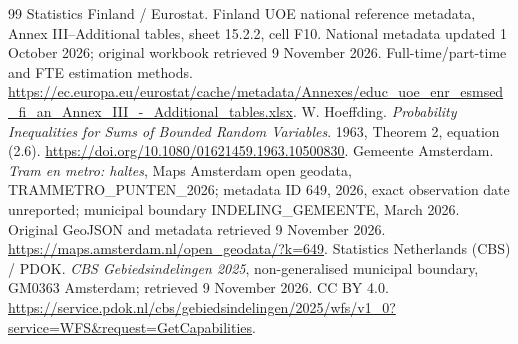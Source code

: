 \begin{thebibliography}{99}
 Statistics Finland / Eurostat. Finland UOE national
reference metadata, Annex III--Additional tables, sheet 15.2.2, cell F10.
National metadata updated 1 October 2026; original workbook retrieved
9 November 2026. Full-time/part-time and FTE estimation methods.
\url{https://ec.europa.eu/eurostat/cache/metadata/Annexes/educ_uoe_enr_esmsed_fi_an_Annex_III_-_Additional_tables.xlsx}.
 W. Hoeffding.
\textit{Probability Inequalities for Sums of Bounded Random Variables}.
1963, Theorem 2, equation (2.6).
\url{https://doi.org/10.1080/01621459.1963.10500830}.
 Gemeente Amsterdam.
\textit{Tram en metro: haltes}, Maps Amsterdam open geodata,
TRAMMETRO\_PUNTEN\_2026; metadata ID 649, 2026, exact observation date unreported; municipal boundary
INDELING\_GEMEENTE, March 2026.
Original GeoJSON and metadata retrieved 9 November 2026.
\url{https://maps.amsterdam.nl/open_geodata/?k=649}.
 Statistics Netherlands (CBS) / PDOK.
\textit{CBS Gebiedsindelingen 2025}, non-generalised municipal boundary,
GM0363 Amsterdam; retrieved 9 November 2026. CC BY 4.0.
\url{https://service.pdok.nl/cbs/gebiedsindelingen/2025/wfs/v1_0?service=WFS&request=GetCapabilities}.
\end{thebibliography}
